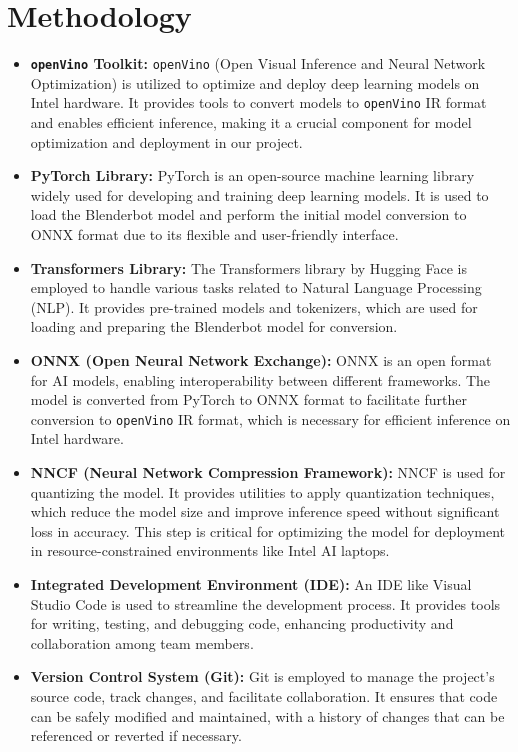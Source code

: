 \documentclass{josis}
\begin{document}
\section{Methodology}
\begin{itemize}
    \item \textbf{\texttt{openVino} Toolkit:} \texttt{openVino} (Open Visual Inference and Neural Network Optimization) is utilized to optimize and deploy deep learning models on Intel hardware. It provides tools to convert models to \texttt{openVino} IR format and enables efficient inference, making it a crucial component for model optimization and deployment in our project.

    \item \textbf{PyTorch Library:} PyTorch is an open-source machine learning library widely used for developing and training deep learning models. It is used to load the Blenderbot model and perform the initial model conversion to ONNX format due to its flexible and user-friendly interface.

    \item \textbf{Transformers Library:} The Transformers library by Hugging Face is employed to handle various tasks related to Natural Language Processing (NLP). It provides pre-trained models and tokenizers, which are used for loading and preparing the Blenderbot model for conversion.

    \item \textbf{ONNX (Open Neural Network Exchange):} ONNX is an open format for AI models, enabling interoperability between different frameworks. The model is converted from PyTorch to ONNX format to facilitate further conversion to \texttt{openVino} IR format, which is necessary for efficient inference on Intel hardware.

    \item \textbf{NNCF (Neural Network Compression Framework):} NNCF is used for quantizing the model. It provides utilities to apply quantization techniques, which reduce the model size and improve inference speed without significant loss in accuracy. This step is critical for optimizing the model for deployment in resource-constrained environments like Intel AI laptops.

    \item \textbf{Integrated Development Environment (IDE):} An IDE like Visual Studio Code is used to streamline the development process. It provides tools for writing, testing, and debugging code, enhancing productivity and collaboration among team members.

    \item \textbf{Version Control System (Git):} Git is employed to manage the project's source code, track changes, and facilitate collaboration. It ensures that code can be safely modified and maintained, with a history of changes that can be referenced or reverted if necessary.
\end{itemize}
\end{document}
